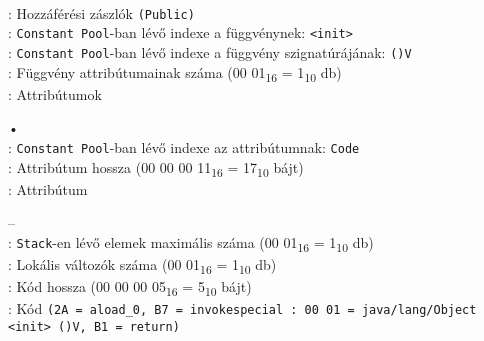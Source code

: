 \begin{compactitem}
\begin{compactitem}
    \setlength\itemsep{-5px}
    \item {}     \\
    : Hozzáférési zászlók \lstinline{(Public)} \\
    : \lstinline{Constant Pool}-ban lévő indexe a függvénynek: \lstinline{<init>} \\
    : \lstinline{Constant Pool}-ban lévő indexe a függvény szignatúrájának: \lstinline{()V} \\
    : Függvény attribútumainak száma (00 01\textsubscript{16} = 1\textsubscript{10} db) \\
    : Attribútumok
    \begin{compactitem}
        \setlength\itemsep{-5px}
        \item[•]    \\
        : \lstinline{Constant Pool}-ban lévő indexe az attribútumnak: \lstinline{Code} \\
        : Attribútum hossza (00 00 00 11\textsubscript{16} = 17\textsubscript{10} bájt) \\
        : Attribútum
            \begin{compactitem}
            \setlength\itemsep{0px}
                \item[–]       \\
                : \lstinline{Stack}-en lévő elemek maximális száma (00 01\textsubscript{16} = 1\textsubscript{10} db) \\
                : Lokális változók száma (00 01\textsubscript{16} = 1\textsubscript{10} db) \\
                : Kód hossza (00 00 00 05\textsubscript{16} = 5\textsubscript{10} bájt) \\
                : Kód \lstinline{(2A = aload_0, B7 = invokespecial : 00 01 = java/lang/Object <init> ()V, B1 = return)}  \\

\end{compactitem}
\end{compactitem}
\end{compactitem}
\end{compactitem}
